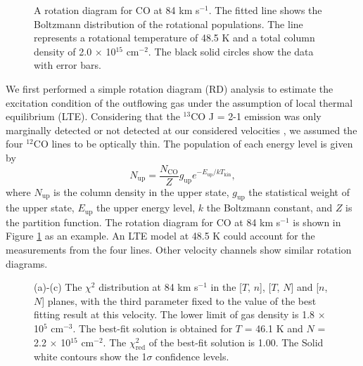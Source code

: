 \begin{figure}[tbp]
\caption{A rotation diagram for CO at 84 km s$^{-1}$. The fitted line shows the Boltzmann distribution of the rotational populations. The line represents a rotational temperature of 48.5 K and a total column density of 2.0 $\times$ 10$^{15}$ cm$^{-2}$. The black solid circles show the data with error bars. \label{fig:figrd}}
\end{figure}

We first performed a simple rotation diagram (RD) analysis \citep{1999ApJ...517..209G} to estimate the excitation condition of the outflowing gas under the assumption of local thermal equilibrium (LTE). Considering that the $^{13}$CO J = 2-1 emission was only marginally detected or not detected at our considered velocities \citep{2009ApJ...696...66Q}, we assumed the four $^{12}$CO lines to be optically thin. The population of each energy level is given by 
\begin{equation}
N_{\mathrm{up}} = \frac{N_\mathrm{CO}}{Z} g_\mathrm{up} e^{-E_\mathrm{up}/kT_\mathrm{kin}},
\end{equation}
where $N_\mathrm{up}$ is the column density in the upper state, $g_\mathrm{up}$ the statistical weight of the upper state, $E_\mathrm{up}$ the upper energy level, $k$ the Boltzmann constant, and $Z$ is the partition function. The rotation diagram for CO at 84 km s$^{-1}$ is shown in Figure \ref{fig:figrd} as an example. An LTE model at 48.5 K could account for the measurements from the four lines. Other velocity channels show similar rotation diagrams.


\begin{figure}[!tbp]
\caption{(a)-(c) The $\chi^2$ distribution at 84 km s$^{-1}$ in the [$T$, $n$], [$T$, $N$] and [$n$, $N$] planes, with the third parameter fixed to the value of the best fitting result at this velocity. The lower limit of gas density is 1.8 $\times$ 10$^{5}$ cm$^{-3}$. The best-fit solution is obtained for $T$ =  46.1 K and $N$ = 2.2 $\times$ 10$^{15}$ cm$^{-2}$. The $\chi^2_{\mathrm{red}}$ of the best-fit solution is 1.00. The Solid white contours show the 1$\sigma$ confidence levels. \label{fig:figchi}}
\end{figure}

